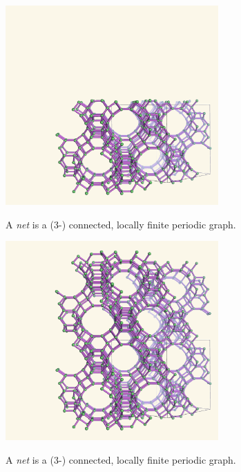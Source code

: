 \documentclass{beamer}
\begin{document}
\begin{frame}
  \begin{center}
    \includegraphics[height=3in]{fau-211}

    A {\em net} is a (3-) connected, locally finite periodic graph.
  \end{center}
\end{frame}

\begin{frame}
  \begin{center}
    \includegraphics[height=3in]{fau-221}

    A {\em net} is a (3-) connected, locally finite periodic graph.
  \end{center}
\end{frame}
\end{document}

